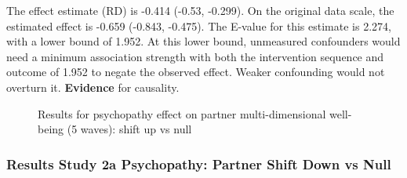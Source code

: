 \documentclass[
  singlecolumn]{article}
\begin{document}
The effect estimate (RD) is -0.414 (-0.53, -0.299). On the original data
scale, the estimated effect is -0.659 (-0.843, -0.475). The E-value for
this estimate is 2.274, with a lower bound of 1.952. At this lower
bound, unmeasured confounders would need a minimum association strength
with both the intervention sequence and outcome of 1.952 to negate the
observed effect. Weaker confounding would not overturn it.
\textbf{Evidence} for causality.

\begin{figure}


\caption{\label{fig-results-psychopathy-partner-up-long}Results for
psychopathy effect on partner multi-dimensional well-being (5 waves):
shift up vs null}

\end{figure}%

\newpage{}

\subsubsection{Results Study 2a Psychopathy: Partner Shift Down vs
Null}\label{results-study-2a-psychopathy-partner-shift-down-vs-null}
\end{document}
